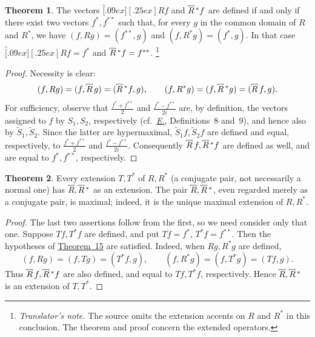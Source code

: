 \documentclass[
  paper=b5,
  twoside=true,
  fontsize=13pt,
  headings=normal,
  bookmarkpackage=false
]{scrartcl}
\theoremstyle{definition}
\newtheorem{theorem}{Theorem}
\newcommand{\TheoremRef}[1]{\hyperref[thm:#1]{Theorem~#1}}
\newcommand{\Eref}{\hyperref[fn:E-paper]{\emph{E.}}}
\newcommand{\MaximalExtension}[1]{\overbracket[.09ex][.25ex]{#1}}
\newcommand{\AdjointMaximalExtension}[1]{\MaximalExtension{#1}\vphantom{#1}^{*}}
\newcounter{translatornote}
\newcounter{savedfootnote}
\newcommand{\TranslatorNote}[1]{%
  \stepcounter{translatornote}%
  \setcounter{savedfootnote}{\value{footnote}}%
  \begingroup
    \renewcommand{\thefootnote}{T\arabic{translatornote}}%
    \footnote{\textit{Translator's note.} #1}%
  \endgroup
  \setcounter{footnote}{\value{savedfootnote}}}
\begin{document}
\begin{theorem}\label{thm:15}
The vectors \(\MaximalExtension{R}f\) and \(\AdjointMaximalExtension{R}f\) are defined if
and only if there exist two vectors \(f^*,f^{**}\) such that, for every
\(g\) in the common domain of \(R\) and \(R^*\), we have
\((f,Rg)=(f^{**},g)\) and \((f,R^*g)=(f^*,g)\). In that
case \(\MaximalExtension{R}f=f^*\) and
\(\AdjointMaximalExtension{R}f=f^{**}\).\TranslatorNote{The source omits the
extension accents on \(R\) and \(R^*\) in this conclusion. The theorem
and proof concern the extended operators.}
\end{theorem}

\begin{proof}
Necessity is clear:
\[
  (f,Rg)=(f,\MaximalExtension{R}g)=(\AdjointMaximalExtension{R}f,g),
  \qquad
  (f,R^*g)=(f,\AdjointMaximalExtension{R}g)=(\MaximalExtension{R}f,g).
\]
For sufficiency, observe that \(\frac{f^*+f^{**}}2\) and
\(\frac{f^*-f^{**}}{2i}\) are, by definition, the vectors assigned
to \(f\) by \(S_1,S_2\), respectively (cf.\ \Eref, Definitions~8 and~9),
and hence also by \(\widetilde S_1,\widetilde S_2\). Since the latter
are hypermaximal, \(\widetilde S_1f,\widetilde S_2f\) are defined and
equal, respectively, to \(\frac{f^*+f^{**}}2\) and
\(\frac{f^*-f^{**}}{2i}\). Consequently \(\MaximalExtension{R}f,\AdjointMaximalExtension{R}f\) are defined as well,
and are equal to \(f^*,f^{**}\), respectively.
\end{proof}

\begin{theorem}\label{thm:16}
Every extension \(T,T^*\) of \(R,R^*\) (a conjugate pair, not
necessarily a normal one) has \(\MaximalExtension{R},\AdjointMaximalExtension{R}\) as an
extension.  The pair \(\MaximalExtension{R},\AdjointMaximalExtension{R}\), even regarded
merely as a conjugate pair, is maximal; indeed, it is the unique maximal
extension of \(R,R^*\).
\end{theorem}

\begin{proof}
The last two assertions follow from the first, so we need consider only
that one. Suppose \(Tf,T^*f\) are defined, and put \(Tf=f^*\),
\(T^*f=f^{**}\). Then the hypotheses of \TheoremRef{15} are
satisfied. Indeed, when
\(Rg,R^*g\) are defined,
\[
  (f,Rg)=(f,Tg)=(T^*f,g),\qquad
  (f,R^*g)=(f,T^*g)=(Tf,g).
\]
Thus \(\MaximalExtension{R}f,\AdjointMaximalExtension{R}f\) are also defined, and equal to
\(Tf,T^*f\), respectively.  Hence
\(\MaximalExtension{R},\AdjointMaximalExtension{R}\) is an extension of \(T,T^*\).
\end{proof}
\end{document}

